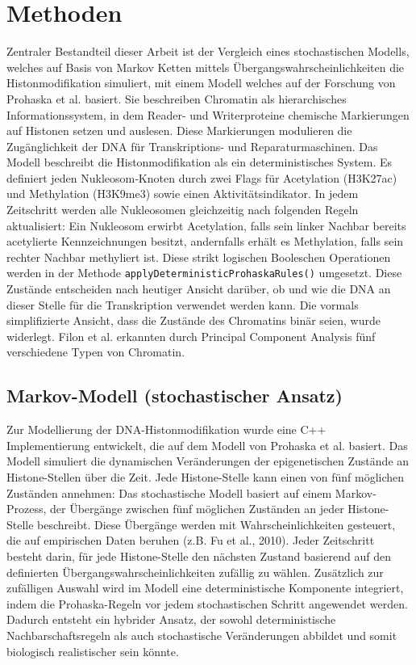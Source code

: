 \documentclass{SeminarV2}
\begin{document}
\section{Methoden}
Zentraler Bestandteil dieser Arbeit ist der Vergleich eines stochastischen Modells, welches auf Basis von Markov Ketten mittels \"{U}bergangswahrscheinlichkeiten die Histonmodifikation simuliert, mit einem Modell welches auf der Forschung von
Prohaska et al. basiert.
Sie beschreiben Chromatin als hierarchisches Informationssystem, in dem Reader- und Writerproteine chemische Markierungen auf Histonen setzen und auslesen. 
Diese Markierungen modulieren die Zugänglichkeit der DNA für Transkriptions- und Reparaturmaschinen.
Das Modell beschreibt die Histonmodifikation als ein deterministisches System.
Es definiert jeden Nukleosom‑Knoten durch zwei Flags für Acetylation (H3K27ac) und Methylation (H3K9me3) sowie einen Aktivitätsindikator. In jedem Zeitschritt werden alle Nukleosomen gleichzeitig nach folgenden Regeln aktualisiert: 
Ein Nukleosom erwirbt Acetylation, falls sein linker Nachbar bereits acetylierte Kennzeichnungen besitzt, andernfalls erhält es Methylation, falls sein rechter Nachbar methy­liert ist. Diese strikt logischen Booleschen Operationen werden in der Methode \texttt{applyDeterministicProhaskaRules()} umgesetzt.
Diese Zustände entscheiden nach heutiger Ansicht darüber, ob und wie die DNA an dieser Stelle für die Transkription verwendet werden kann.
Die vormals simplifizierte Ansicht, dass die Zustände des Chromatins binär seien, wurde widerlegt. Filon et al. erkannten durch Principal Component Analysis fünf verschiedene 
Typen von Chromatin. \cite{filon-2010}


\subsection{Markov-Modell (stochastischer Ansatz)}
Zur Modellierung der DNA-Histonmodifikation wurde eine C++ Implementierung entwickelt, die auf dem Modell von Prohaska et al. basiert. Das Modell simuliert die dynamischen Ver\"{a}nderungen der epigenetischen Zust\"{a}nde an Histone-Stellen \"{u}ber die Zeit. Jede Histone-Stelle kann einen von f\"{u}nf m\"{o}glichen Zust\"{a}nden annehmen:
Das stochastische Modell basiert auf einem Markov-Prozess, der Übergänge zwischen fünf möglichen Zuständen an jeder Histone-Stelle beschreibt. Diese Übergänge werden mit Wahrscheinlichkeiten gesteuert, die auf empirischen Daten beruhen (z.B. Fu et al., 2010). Jeder Zeitschritt besteht darin, für jede Histone-Stelle den nächsten Zustand basierend auf den definierten Übergangswahrscheinlichkeiten zufällig zu wählen. Zusätzlich zur zufälligen Auswahl wird im Modell eine deterministische Komponente integriert, indem die Prohaska-Regeln vor jedem stochastischen Schritt angewendet werden. Dadurch entsteht ein hybrider Ansatz, der sowohl deterministische Nachbarschaftsregeln als auch stochastische Veränderungen abbildet und somit biologisch realistischer sein könnte.
\end{document}
